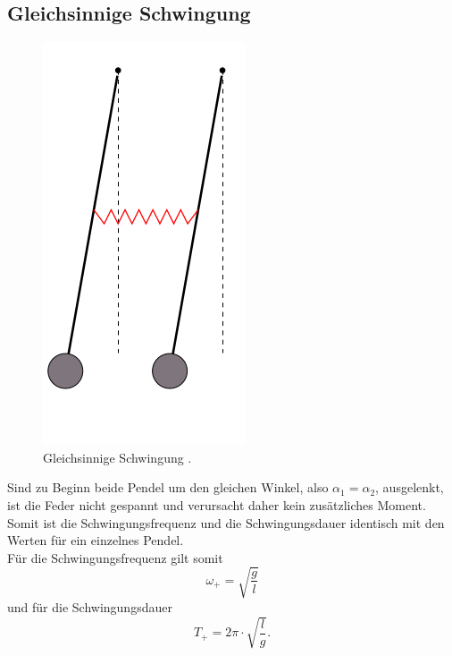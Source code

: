 \subsection{Gleichsinnige Schwingung}
\FloatBarrier
\begin{figure}
	\centering
	\includegraphics[width=0.4\linewidth]{Bilder/gleichphasig.png}
	\caption{Gleichsinnige Schwingung \cite{Anleitung}.}
	\label{fig:gleich}
\end{figure}
\FloatBarrier
Sind zu Beginn beide Pendel um den gleichen Winkel, also $\alpha_1=\alpha_2$, ausgelenkt, ist die Feder nicht gespannt und verursacht daher kein zusätzliches Moment.
Somit ist die Schwingungsfrequenz und die Schwingungsdauer identisch mit den Werten für ein einzelnes Pendel.\\
Für die Schwingungsfrequenz gilt somit
\begin{equation}
	\label{eqn:wgleich}
	\omega_{\mathrm{+}}=\sqrt{\frac{g}{l}}
\end{equation}
und für die Schwingungsdauer
\begin{equation}
	\label{eqn:tgleich}
	T_{\mathrm{+}}=2\pi\cdot\sqrt{\frac{l}{g}} \text{.}
\end{equation}

